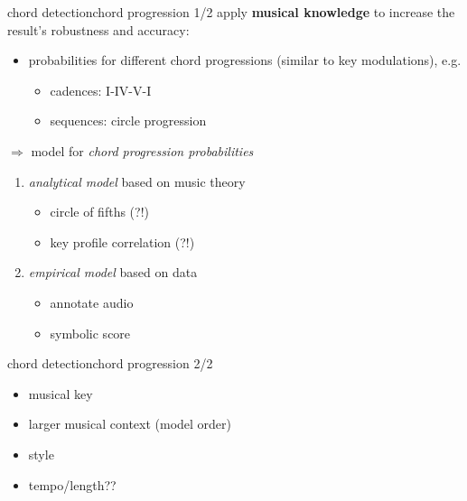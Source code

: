         \begin{frame}{chord detection}{chord progression 1/2}
            apply \textbf{musical knowledge} to increase the result's robustness and accuracy:
            
            \begin{itemize}
                \item	probabilities for different chord progressions (similar to key modulations), e.g.
                \begin{itemize}
                    \item	cadences: I-IV-V-I
                    \item	sequences: circle progression
                    
                \end{itemize}
            \end{itemize}

            $\Rightarrow$ model for \textit{chord progression probabilities}
            \begin{enumerate}
								\smallskip
							  \item<2->	\textit{analytical model} based on music theory
                    \begin{itemize}
                        \item	circle of fifths (?!)
                        \item	key profile correlation (?!)
                    \end{itemize}
                \smallskip
							  \item<3->	\textit{empirical model} based on data
                    \begin{itemize}	
                        \item	annotate audio
                        \item	symbolic score
                    \end{itemize}
            \end{enumerate}
        \end{frame}
        \begin{frame}{chord detection}{chord progression 2/2}

            \begin{itemize}
                \item 	musical key
                \item	larger musical context (model order)
                \item	style
                \item   tempo/length??
            \end{itemize}
        \end{frame}
